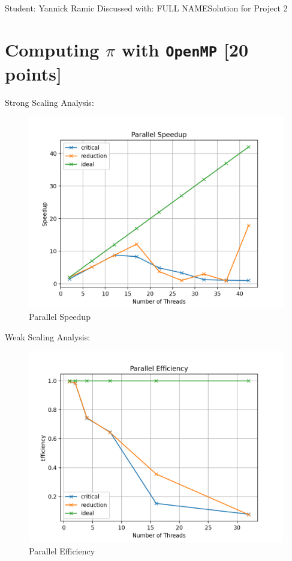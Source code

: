 \documentclass[unicode,11pt,a4paper,oneside,numbers=endperiod,openany]{scrartcl}
\begin{document}
\setassignment
{}

            {Student: Yannick Ramic}
            {Discussed with: FULL NAME}{Solution for Project 2}{}
\newline

\assignmentpolicy

\section{Computing $\pi$ with \texttt{OpenMP} [20 points]}
Strong Scaling Analysis:
\begin{figure}[H]
    \centering
    \includegraphics[width=\textwidth]{Images/parallel_speedup.png}
    \caption{Parallel Speedup}
    \label{fig:strong_scaling}
  \end{figure}

Weak Scaling Analysis:
\begin{figure}[H]
    \centering
    \includegraphics[width=\textwidth]{Images/parallel_efficiency.png}
    \caption{Parallel Efficiency}
    \label{fig:weak_scaling}
  \end{figure}
\end{document}
